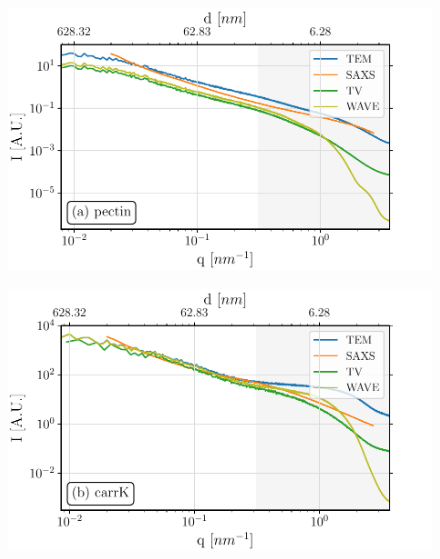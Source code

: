 \begin{figure}[!ht]
  \begin{minipage}{0.32\textwidth}

    \noindent\includegraphics[width=\linewidth]{Figures/chapter-temsaxs/saxs-tem-TV-pectin.pdf}\label{fig:denoise_pectin}
  \end{minipage}
  \begin{minipage}{0.32\textwidth}

    \includegraphics[width=\linewidth]{Figures/chapter-temsaxs/saxs-tem-TV-carK.pdf}\label{fig:denoise_carrK}
  \end{minipage}
  \begin{minipage}{0.32\textwidth}


\end{minipage}
\end{figure}
